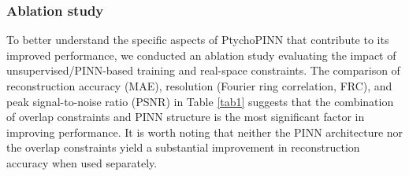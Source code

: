 \documentclass[sn-mathphys]{sn-jnl}%
\theoremstyle{thmstyleone}%
\theoremstyle{thmstyletwo}%
\theoremstyle{thmstylethree}%
\begin{document}

\subsubsection{Ablation study}

To better understand the specific aspects of PtychoPINN that contribute to its improved performance, we conducted an ablation study evaluating the impact of unsupervised/PINN-based training and real-space constraints. The comparison of reconstruction accuracy (MAE), resolution (Fourier ring correlation, FRC), and peak signal-to-noise ratio (PSNR) in Table \ref{tab1} suggests that the combination of overlap constraints and PINN structure is the most significant factor in improving performance. It is worth noting that neither the PINN architecture nor the overlap constraints yield a substantial improvement in reconstruction accuracy when used separately.
\end{document}
